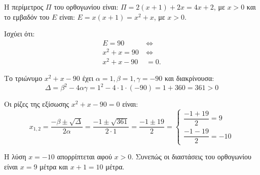
\begin{alist}
\item Η περίμετρος $\Pi$ του ορθογωνίου είναι:
$\Pi = 2(x + 1) + 2x = 4x + 2$, με $x > 0$
και το εμβαδόν του $E$ είναι:
$E = x(x + 1) = x^2 + x$, με $x > 0$.

\item Ισχύει ότι:
\begin{align*}
E = 90 \ &\Leftrightarrow \\
x^2 + x = 90 \ &\Leftrightarrow \\
x^2 + x - 90 &= 0.
\end{align*}

Το τριώνυμο $x^2 + x - 90$ έχει $\alpha = 1, \beta = 1, \gamma = -90$ και διακρίνουσα:
\[\Delta = \beta^2 - 4\alpha\gamma = 1^2 - 4 \cdot 1 \cdot (-90) = 1 + 360 = 361 > 0\]

Οι ρίζες της εξίσωσης $x^2 + x - 90 = 0$ είναι:
\[x_{1,2} = \dfrac{-\beta \pm \sqrt{\Delta}}{2\alpha} = \dfrac{-1 \pm \sqrt{361}}{2 \cdot 1} = \dfrac{-1 \pm 19}{2} = \begin{cases} \dfrac{-1 + 19}{2} = 9 \\[2ex] \dfrac{-1 - 19}{2} = -10 \end{cases}\]

Η λύση $x = -10$ απορρίπτεται αφού $x > 0$.
Συνεπώς οι διαστάσεις του ορθογωνίου είναι $x = 9$ μέτρα και $x + 1 = 10$ μέτρα.
\end{alist}

